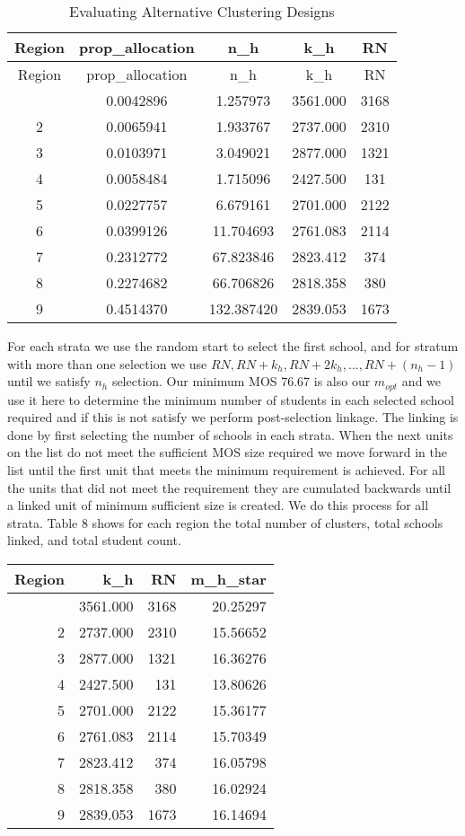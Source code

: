 \documentclass[
  12pt]{article}
\begin{document}
\begin{longtable}[]{@{}ccccc@{}}
\caption{Evaluating Alternative Clustering Designs}\tabularnewline
\toprule\noalign{}
Region & prop\_allocation & n\_h & k\_h & RN \\
\midrule\noalign{}
\endfirsthead
\toprule\noalign{}
Region & prop\_allocation & n\_h & k\_h & RN \\
\midrule\noalign{}
\endhead
\bottomrule\noalign{}
\endlastfoot
1 & 0.0042896 & 1.257973 & 3561.000 & 3168 \\
2 & 0.0065941 & 1.933767 & 2737.000 & 2310 \\
3 & 0.0103971 & 3.049021 & 2877.000 & 1321 \\
4 & 0.0058484 & 1.715096 & 2427.500 & 131 \\
5 & 0.0227757 & 6.679161 & 2701.000 & 2122 \\
6 & 0.0399126 & 11.704693 & 2761.083 & 2114 \\
7 & 0.2312772 & 67.823846 & 2823.412 & 374 \\
8 & 0.2274682 & 66.706826 & 2818.358 & 380 \\
9 & 0.4514370 & 132.387420 & 2839.053 & 1673 \\
\end{longtable}

For each strata we use the random start to select the first school, and
for stratum with more than one selection we use
\(RN, RN+k_h, RN+2k_h,...,RN +(n_h-1)\) until we satisfy \(n_h\)
selection. Our minimum MOS 76.67 is also our \(m_{opt}\) and we use it
here to determine the minimum number of students in each selected school
required and if this is not satisfy we perform post-selection linkage.
The linking is done by first selecting the number of schools in each
strata. When the next units on the list do not meet the sufficient MOS
size required we move forward in the list until the first unit that
meets the minimum requirement is achieved. For all the units that did
not meet the requirement they are cumulated backwards until a linked
unit of minimum sufficient size is created. We do this process for all
strata. Table 8 shows for each region the total number of clusters,
total schools linked, and total student count.

\begin{longtable}[]{@{}rrrr@{}}
\toprule\noalign{}
Region & k\_h & RN & m\_h\_star \\
\midrule\noalign{}
\endhead
\bottomrule\noalign{}
\endlastfoot
1 & 3561.000 & 3168 & 20.25297 \\
2 & 2737.000 & 2310 & 15.56652 \\
3 & 2877.000 & 1321 & 16.36276 \\
4 & 2427.500 & 131 & 13.80626 \\
5 & 2701.000 & 2122 & 15.36177 \\
6 & 2761.083 & 2114 & 15.70349 \\
7 & 2823.412 & 374 & 16.05798 \\
8 & 2818.358 & 380 & 16.02924 \\
9 & 2839.053 & 1673 & 16.14694 \\
\end{longtable}
\end{document}
